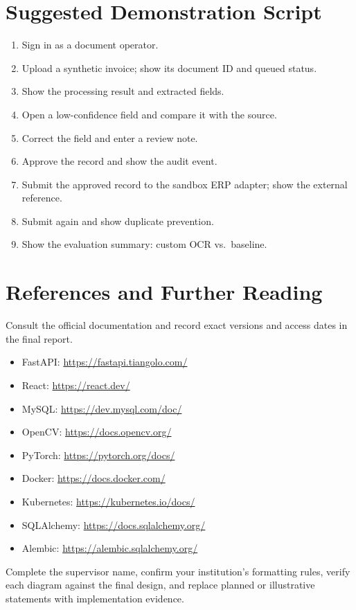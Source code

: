 \chapter{Suggested Demonstration Script}
\begin{enumerate}
\item Sign in as a document operator.
\item Upload a synthetic invoice; show its document ID and queued status.
\item Show the processing result and extracted fields.
\item Open a low-confidence field and compare it with the source.
\item Correct the field and enter a review note.
\item Approve the record and show the audit event.
\item Submit the approved record to the sandbox ERP adapter; show the external reference.
\item Submit again and show duplicate prevention.
\item Show the evaluation summary: custom OCR vs.\ baseline.
\end{enumerate}

\chapter{References and Further Reading}
Consult the official documentation and record exact versions and access dates in the final report.
\begin{itemize}
\item FastAPI: \url{https://fastapi.tiangolo.com/}
\item React: \url{https://react.dev/}
\item MySQL: \url{https://dev.mysql.com/doc/}
\item OpenCV: \url{https://docs.opencv.org/}
\item PyTorch: \url{https://pytorch.org/docs/}
\item Docker: \url{https://docs.docker.com/}
\item Kubernetes: \url{https://kubernetes.io/docs/}
\item SQLAlchemy: \url{https://docs.sqlalchemy.org/}
\item Alembic: \url{https://alembic.sqlalchemy.org/}
\end{itemize}

\begin{warnbox}
Complete the supervisor name, confirm your institution's formatting rules, verify each diagram against the final design, and replace planned or illustrative statements with implementation evidence.
\end{warnbox}
